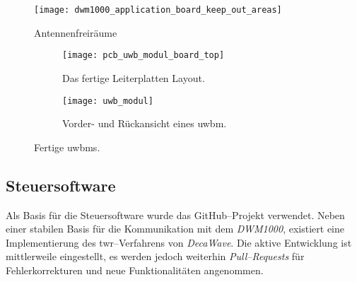 \begin{figure}
	\centering
	\texttt{[image: dwm1000\_application\_board\_keep\_out\_areas]}
	\caption{Antennenfreiräume}
	\label{fig:dwm1000_application_board_keep_out_areas}
\end{figure}

%

\begin{figure}
	\begin{subfigure}[t]{0.3\textwidth}
		\texttt{[image: pcb\_uwb\_modul\_board\_top]}
		\caption{Das fertige Leiterplatten Layout.}
		\label{fig:pcb_uwb_modul_board_top}
	\end{subfigure}
	\hfill
	\begin{subfigure}[t]{0.6\textwidth}
		\centering
		\texttt{[image: uwb\_modul]}
		\caption{Vorder- und Rückansicht eines \gls{uwbm}.}
		\label{fig:uwb_modul}
	\end{subfigure}
	\caption{Fertige \glspl{uwbm}.}
	\label{fig:fertige_uwb_module}
\end{figure}


\begin{comment}
------------------------------------------------------------------------------------------
- Woher kommt die Steuersoftware und wer ist für diese Zustandig?
	- Aktive Entwicklung wurde eingestellt
	- Was kann ich mit dieser Software machen?
\end{comment}
\subsection{Steuersoftware}

Als Basis für die Steuersoftware wurde das GitHub--Projekt \cite{Trojer2015} verwendet. Neben einer stabilen Basis für die Kommunikation mit dem \textit{DWM1000}, existiert eine Implementierung des \Gls{twr}--Verfahrens von \textit{DecaWave}. Die aktive Entwicklung ist mittlerweile eingestellt, es werden jedoch weiterhin \textit{Pull--Requests\footnotemark} für Fehlerkorrekturen und neue Funktionalitäten angenommen.

